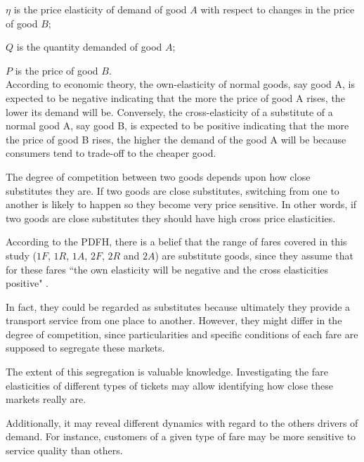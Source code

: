 $\eta$ is the price elasticity of demand of good $A$ with respect to changes in the price of good $B$;

$Q$ is the quantity demanded of good $A$;

$P$ is the price of good $B$.
\\[3pt]

According to economic theory, the own-elasticity of normal goods, say good A, is expected to be negative indicating that the more the price of good A rises, the lower its demand will be. Conversely, the cross-elasticity of a substitute of a normal good A, say good B, is expected to be positive indicating that the more the price of good B rises, the higher the demand of the good A will be because consumers tend to trade-off to the cheaper good.

The degree of competition between two goods depends upon how close substitutes they are. If two goods are close substitutes, switching from one to another is likely to happen so they become very price sensitive. In other words, if two goods are close substitutes they should have high cross price elasticities.

According to the PDFH, there is a belief that the range of fares covered in this study ($1F$, $1R$, $1A$, $2F$, $2R$ and $2A$) are substitute goods, since they assume that for these fares ``the own elasticity will be negative and the cross elasticities positive" \citep[p.~8, Chapter B2]{pdfh}. 

In fact, they could be regarded as substitutes because ultimately they provide a transport service from one place to another. However, they might differ in the degree of competition, since particularities and specific conditions of each fare are supposed to segregate these markets. 

The extent of this segregation is valuable knowledge. Investigating the fare elasticities of different types of tickets may allow identifying how close these markets really are. 

Additionally, it may reveal different dynamics with regard to the others drivers of demand. For instance, customers of a given type of fare may be more sensitive to service quality than others.

